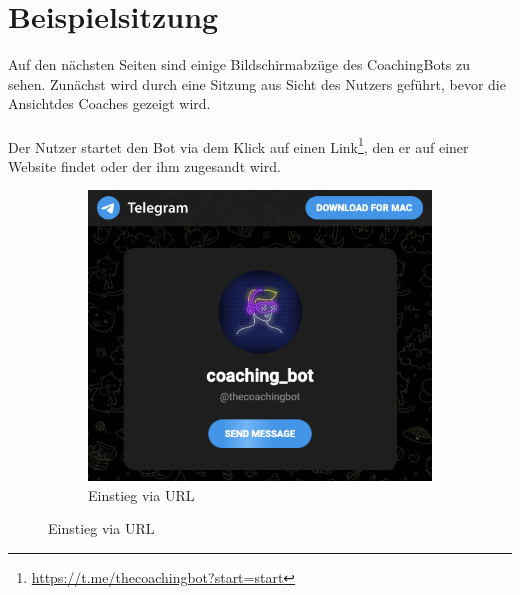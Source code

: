 \label{Beispiele}
\chapter{Beispielsitzung}

	Auf den nächsten Seiten sind einige Bildschirmabzüge des CoachingBots zu sehen. Zunächst wird durch eine Sitzung aus Sicht des Nutzers geführt, bevor die Ansichtdes Coaches gezeigt wird.\\ 
	\\
	Der Nutzer startet den Bot via dem Klick auf einen Link\footnote{\url{https://t.me/thecoachingbot?start=start}}, den er auf einer Website findet oder der ihm zugesandt wird.


	\begin{figure}

		\hfill

		\begin{subfigure}{0.3\textwidth}
			\includegraphics[width=\textwidth]{images/Screenshots/link.png}
			\caption{Einstieg via URL}
			\label{fig: scs..link}
		\end{subfigure}
		
		\hfill
		

\end{figure}
